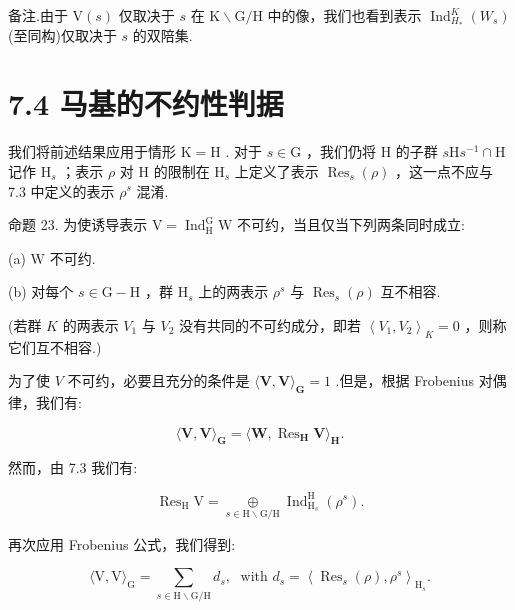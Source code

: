 \documentclass[10pt]{article}
\begin{document}
备注.由于 \(\mathrm{V}\left( s\right)\) 仅取决于 \(s\) 在 \(\mathrm{K} \smallsetminus  \mathrm{G}/\mathrm{H}\) 中的像，我们也看到表示 \({\operatorname{Ind}}_{{H}_{ * }}^{K}\left( {W}_{s}\right)\) (至同构)仅取决于 \(s\) 的双陪集.

\section*{7.4 马基的不约性判据}

我们将前述结果应用于情形 \(\mathrm{K} = \mathrm{H}\) . 对于 \(s \in  \mathrm{G}\) ，我们仍将 \(\mathrm{H}\) 的子群 \(s\mathrm{H}{s}^{-1} \cap  \mathrm{H}\) 记作 \({\mathrm{H}}_{s}\) ；表示 \(\rho\) 对 \(\mathrm{H}\) 的限制在 \({\mathrm{H}}_{s}\) 上定义了表示 \({\operatorname{Res}}_{s}\left( \rho \right)\) ，这一点不应与 7.3 中定义的表示 \({\rho }^{s}\) 混淆.

命题 23. 为使诱导表示 \(\mathrm{V} = {\operatorname{Ind}}_{\mathrm{H}}^{\mathrm{G}}\mathrm{W}\) 不可约，当且仅当下列两条同时成立:

(a) \(\mathrm{W}\) 不可约.

(b) 对每个 \(s \in  \mathrm{G} - \mathrm{H}\) ，群 \({\mathrm{H}}_{s}\) 上的两表示 \({\rho }^{s}\) 与 \({\operatorname{Res}}_{s}\left( \rho \right)\) 互不相容.

(若群 \(K\) 的两表示 \({V}_{1}\) 与 \({V}_{2}\) 没有共同的不可约成分，即若 \({\left\langle  {V}_{1},{V}_{2}\right\rangle  }_{K} = 0\) ，则称它们互不相容.)

为了使 \(V\) 不可约，必要且充分的条件是 \(\langle \mathbf{V},\mathbf{V}{\rangle }_{\mathbf{G}} = 1\) .但是，根据 Frobenius 对偶律，我们有:

\[
\langle \mathbf{V},\mathbf{V}{\rangle }_{\mathbf{G}} = \langle \mathbf{W},{\operatorname{Res}}_{\mathbf{H}}\mathbf{V}{\rangle }_{\mathbf{H}}.
\]

然而，由 7.3 我们有:

\[
{\operatorname{Res}}_{\mathrm{H}}\mathrm{V} = \mathop{\oplus }\limits_{{s \in  \mathrm{H} \smallsetminus  \mathrm{G}/\mathrm{H}}}{\operatorname{Ind}}_{{\mathrm{H}}_{s}}^{\mathrm{H}}\left( {\rho }^{s}\right) .
\]

再次应用 Frobenius 公式，我们得到:

\[
\langle \mathrm{V},\mathrm{V}{\rangle }_{\mathrm{G}} = \mathop{\sum }\limits_{{s \in  \mathrm{H} \smallsetminus  \mathrm{G}/\mathrm{H}}}{d}_{s},\;\text{ with }{d}_{s} = {\left\langle  {\operatorname{Res}}_{s}\left( \rho \right) ,{\rho }^{s}\right\rangle  }_{{\mathrm{H}}_{s}}.
\]
\end{document}
